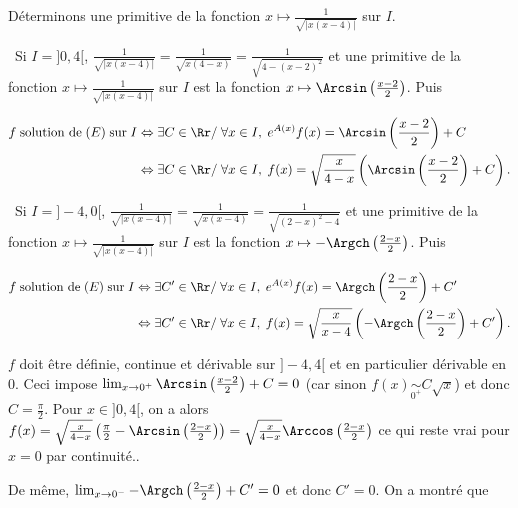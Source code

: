 {{Déterminons une primitive de la fonction $x\mapsto\frac{1}{\sqrt{|x(x-4)|}}$ sur $I$.

\textbullet~Si $I=]0,4[$, $\frac{1}{\sqrt{|x(x-4)|}}=\frac{1}{\sqrt{x(4-x)}}=\frac{1}{\sqrt{4-(x-2)^2}}$ et une primitive de la fonction $x\mapsto\frac{1}{\sqrt{|x(x-4)|}}$ sur $I$ est la fonction $x\mapsto\Arcsin\left(\frac{x-2}{2}\right)$. Puis

\begin{align*}\ensuremath
f\;\text{solution de}\;(E)\;\text{sur}\;I&\Leftrightarrow\exists C\in\Rr/\;\forall x\in I,\;e^{A(x)}f(x)=\Arcsin\left(\frac{x-2}{2}\right)+C\\
 &\Leftrightarrow\exists C\in\Rr/\;\forall x\in I,\;f(x)=\sqrt{\frac{x}{4-x}}\left(\Arcsin\left(\frac{x-2}{2}\right)+C\right).
\end{align*}

\textbullet~Si $I=]-4,0[$, $\frac{1}{\sqrt{|x(x-4)|}}=\frac{1}{\sqrt{x(x-4)}}=\frac{1}{\sqrt{(2-x)^2-4}}$ et une primitive de la fonction $x\mapsto\frac{1}{\sqrt{|x(x-4)|}}$ sur $I$ est la fonction $x\mapsto-\Argch\left(\frac{2-x}{2}\right)$. Puis

\begin{align*}\ensuremath
f\;\text{solution de}\;(E)\;\text{sur}\;I&\Leftrightarrow\exists C'\in\Rr/\;\forall x\in I,\;e^{A(x)}f(x)=\Argch\left(\frac{2-x}{2}\right)+C'\\
 &\Leftrightarrow\exists C'\in\Rr/\;\forall x\in I,\;f(x)=\sqrt{\frac{x}{x-4}}\left(-\Argch\left(\frac{2-x}{2}\right)+C'\right).
\end{align*}

$f$ doit être définie, continue et dérivable sur $]-4,4[$ et en particulier dérivable en $0$. Ceci impose $\lim_{x \rightarrow 0^+}\Arcsin\left(\frac{x-2}{2}\right)+C=0$ (car sinon $f(x)\underset{0^+}{\sim}C\sqrt{x}$) et donc $C=\frac{\pi}{2}$. Pour $x\in]0,4[$, on a alors $f(x)=\sqrt{\frac{x}{4-x}}\left(\frac{\pi}{2}-\Arcsin\left(\frac{2-x}{2}\right)\right)=\sqrt{\frac{x}{4-x}}\Arccos\left(\frac{2-x}{2}\right)$ ce qui reste vrai pour $x=0$ par continuité..

De même, $\lim_{x \rightarrow 0^-}-\Argch\left(\frac{2-x}{2}\right)+C'=0$ et donc $C'=0$. On a montré que

\begin{center}
\shadowbox{
$\forall x\in]-4,4[,\;\sum_{n=1}^{+\infty}\frac{1}{nC_{2n}^n}x^n=\left\{
\begin{array}{l}
\sqrt{\frac{x}{4-x}}\Arccos\left(\frac{2-x}{2}\right)\;\text{si}\;x\in[0,4[\\
-\sqrt{\frac{x}{x-4}}\Argch\left(\frac{2-x}{2}\right)\;\text{si}\;x\in]-4,0]
\end{array}
\right.
$.
}
\end{center}}
}